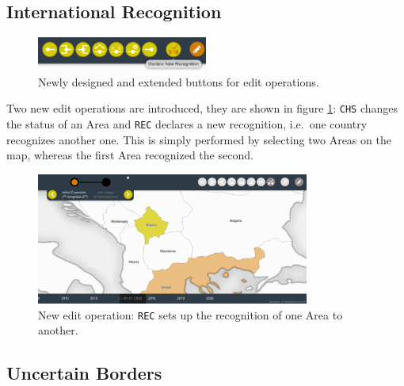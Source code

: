 \subsection{International Recognition} %
\label{sub:international_recognition}

\begin{figure}[ht]
  \centering
  \includegraphics[width = 0.5\textwidth]{graphics/extensions/edit_mode_extension.png}
  \caption{Newly designed and extended buttons for edit operations.}
  \label{fig:edit_mode_extension}
\end{figure}

Two new edit operations are introduced, they are shown in figure \ref{fig:edit_mode_extension}: \texttt{CHS} changes the status of an Area and \texttt{REC} declares a new recognition, i.e.\ one country recognizes another one. This is simply performed by selecting two Areas on the map, whereas the first Area recognized the second.

\begin{figure}[ht]
  \centering
  \includegraphics[width=0.80\textwidth]{graphics/extensions/operation_REC}
  \caption{New edit operation: \texttt{REC} sets up the recognition of one Area to another.}
  \label{fig:uncertainty_operation_REC}
\end{figure}


\subsection{Uncertain Borders} %
\label{sub:uncertain_borders}

